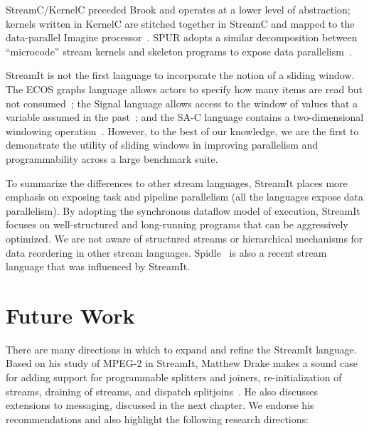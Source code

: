 Stream\-C/Ker\-nel\-C preceded Brook and operates at a lower level of
abstraction; kernels written in KernelC are stitched together in
StreamC and mapped to the data-parallel Imagine
processor~\cite{imagine03ieee}.  SPUR adopts a similar decomposition
between ``microcode'' stream kernels and skeleton programs to expose
data parallelism~\cite{spur05samos}.

StreamIt is not the first language to incorporate the notion of a
sliding window.  The ECOS graphs language allows actors to specify how
many items are read but not consumed~\cite{huang_ecos_1992}; the
Signal language allows access to the window of values that a variable
assumed in the past~\cite{le_guernic_signal--data_1986}; and the SA-C
language contains a two-dimensional windowing
operation~\cite{draper_compiling_2001}.  However, to the best of our
knowledge, we are the first to demonstrate the utility of sliding
windows in improving parallelism and programmability across a large
benchmark suite.

To summarize the differences to other stream languages, StreamIt
places more emphasis on exposing task and pipeline parallelism (all
the languages expose data parallelism).
By adopting the synchronous dataflow model of execution, StreamIt
focuses on well-structured and long-running programs that can be
aggressively optimized.  We are not aware of structured streams or
hierarchical mechanisms for data reordering in other stream languages.
Spidle~\cite{spidle03} is also a recent stream language that was
influenced by StreamIt.

\section{Future Work}
\label{sec:lang-future-work}

There are many directions in which to expand and refine the StreamIt
language.  Based on his study of MPEG-2 in StreamIt, Matthew Drake
makes a sound case for adding support for programmable splitters and
joiners, re-initialization of streams, draining of streams, and
dispatch splitjoins~\cite{drake-thesis}.  He also discusses extensions
to messaging, discussed in the next chapter.  We endorse his
recommendations and also highlight the following research directions:


